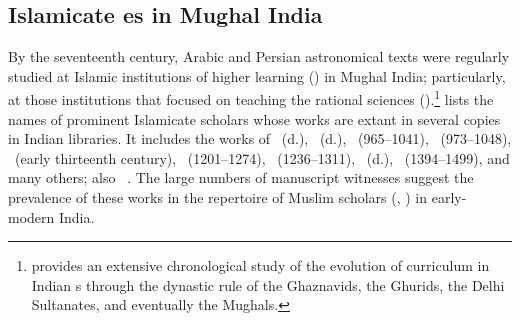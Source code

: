 \subsection{Islamicate \zij es in Mughal India}\label{islamicate_zijes_mughal_india}

By the seventeenth century, Arabic and Persian astronomical texts were regularly studied at Islamic institutions of higher learning (\madrasa) in Mughal India; particularly, at those institutions that focused on teaching the rational sciences (\ulumalaqliyah).\footnote{\textcite[1--88]{Sufi} provides an extensive chronological study of the evolution of curriculum in Indian \madrasa s through the dynastic rule of the Ghaznavids, the Ghurids, the Delhi Sultanates, and eventually the Mughals.} \textcite[Table~1 on p.]{Ansaritransmission} lists the names of prominent Islamicate scholars whose works are extant in several copies in Indian libraries. It includes the works of \abuNasr\ (d.), \Gilanifull\ (d.), \ibmHaytham\ (965--1041), \alBirunifull\ (973--1048), \alJaghmini\ (\circa early thirteenth century), \alTusifull\ (1201--1274), \alShirazifull\ (1236--1311), \alKashifull\ (d.), \UlughBegfull\ (1394--1499), and many others; also \vid\ \textcite[Section~III on pp.--281 and Appendix~I on pp.--294]{Ansaritransmission}. The large numbers of manuscript witnesses suggest the prevalence of these works in the repertoire of Muslim scholars (\ulama, \fudala) in early-modern India. 

